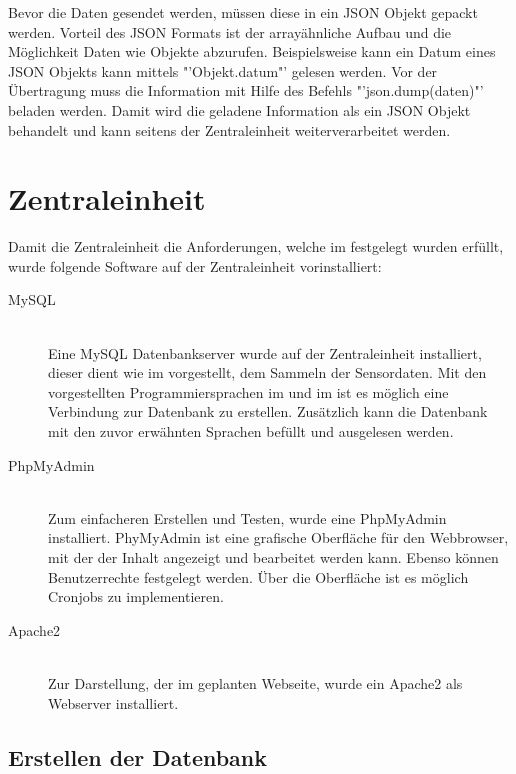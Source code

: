 Bevor die Daten gesendet werden, müssen diese in ein \ac{JSON} Objekt gepackt werden. Vorteil des \ac{JSON} Formats ist der arrayähnliche Aufbau und die Möglichkeit Daten wie Objekte abzurufen. Beispielsweise kann ein Datum eines \ac{JSON} Objekts kann mittels "'Objekt.datum"' gelesen werden. Vor der Übertragung muss die Information mit Hilfe des Befehls "'json.dump(daten)"' beladen werden. Damit wird die geladene Information als ein \ac{JSON} Objekt behandelt und kann seitens der Zentraleinheit weiterverarbeitet werden.
\section{Zentraleinheit}%
Damit die Zentraleinheit die Anforderungen, welche im  festgelegt wurden erfüllt, wurde folgende Software auf der Zentraleinheit vorinstalliert:
\begin{description}
	\item[MySQL] \hfill \\
	Eine MySQL Datenbankserver wurde auf der Zentraleinheit installiert, dieser dient wie im  vorgestellt, dem Sammeln der Sensordaten. Mit den vorgestellten Programmiersprachen im  und im  ist es möglich eine Verbindung zur Datenbank zu erstellen. Zusätzlich kann die Datenbank mit den zuvor erwähnten Sprachen befüllt und ausgelesen werden.
	\item[PhpMyAdmin] \hfill \\
	Zum einfacheren Erstellen und Testen, wurde eine PhpMyAdmin installiert. PhyMyAdmin ist eine grafische Oberfläche für den Webbrowser, mit der der Inhalt angezeigt und bearbeitet werden kann. Ebenso können Benutzerrechte festgelegt werden. Über die Oberfläche ist es möglich Cronjobs zu implementieren.
	\item[Apache2] \hfill \\
	Zur Darstellung, der im  geplanten Webseite, wurde ein Apache2 als Webserver installiert.
\end{description}
\subsection{Erstellen der Datenbank}
